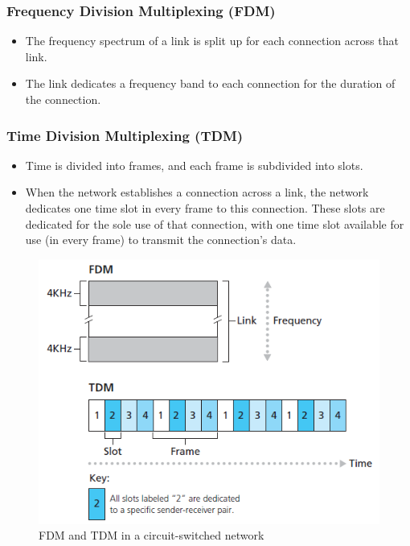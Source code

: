 \documentclass{article}
\theoremstyle{plain}
\theoremstyle{definition}
\begin{document}
\subsubsection{Frequency Division Multiplexing (FDM)}
\begin{itemize}
    \item The frequency spectrum of a link is split up for each connection across that link.
    
    \item The link dedicates a frequency band to each connection for the duration of the connection.
\end{itemize}

\subsubsection{Time Division Multiplexing (TDM)}
\begin{itemize}
    \item Time is divided into frames, and each frame is subdivided into slots. 
    
    \item When the network establishes a connection across a link, the network dedicates one time slot in every frame to this connection. These slots are dedicated for the sole use of that connection, with one time slot available for use (in every frame) to transmit the connection’s data.
    
\end{itemize}

\begin{figure}[ht]
    \centering
    \includegraphics{cn8}
    \caption{FDM and TDM in a circuit-switched network}
    \label{fig:my_label_8}
\end{figure}
\end{document}
